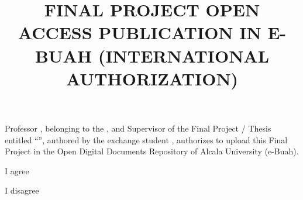 \documentclass[12pt,a4paper,oneside]{article}
\title{FINAL PROJECT OPEN ACCESS PUBLICATION IN E-BUAH (INTERNATIONAL AUTHORIZATION)}             %
\date{}                                            %
\begin{document}

{\large
\maketitle 

\thispagestyle{empty}


Professor \myAcademicTutorFullName, belonging to the \myAcademicTutorForeignUniversity, and Supervisor of the Final Project / Thesis entitled ``\textit{\myBookTitleEnglish{}}'', authored by the exchange student \myAuthorFullName{}, authorizes to upload this Final Project in the Open Digital Documents Repository of Alcala University (e-Buah).

\vspace{0.5cm}

\TextSizedCheckbox{$\XBox$} I agree

\vspace{0.5cm}

\TextSizedCheckbox{$\Box$} I disagree


{}

\vspace{2cm}


}
\end{document}
